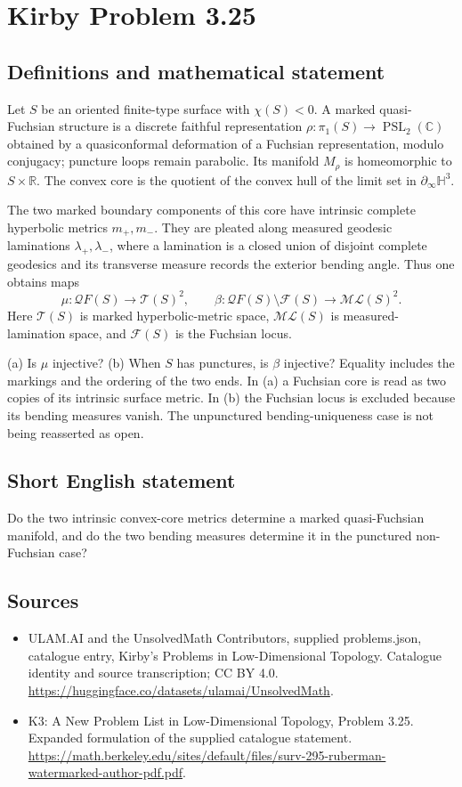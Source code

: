 \documentclass[11pt,a4paper]{article}
\begin{document}
\section*{Kirby Problem 3.25}\label{statement}

\subsection{Definitions and mathematical statement}
Let $S$ be an oriented finite-type surface with $\chi(S)<0$. A marked
quasi-Fuchsian structure is a discrete faithful representation
$\rho:\pi_1(S)\to\operatorname{PSL}_2(\mathbb C)$ obtained by a
quasiconformal deformation of a Fuchsian representation, modulo conjugacy;
puncture loops remain parabolic. Its manifold $M_\rho$ is homeomorphic to
$S\times\mathbb R$. The convex core is the quotient of the convex hull
of the limit set in $\partial_\infty\mathbb H^3$.

The two marked boundary components of this core have intrinsic complete
hyperbolic metrics $m_+,m_-$. They are pleated along measured geodesic
laminations $\lambda_+,\lambda_-$, where a lamination is a closed union
of disjoint complete geodesics and its transverse measure records the
exterior bending angle. Thus one obtains maps
\[
 \mu:\mathcal QF(S)\to\mathcal T(S)^2,\qquad
 \beta:\mathcal QF(S)\setminus\mathcal F(S)\to\mathcal{ML}(S)^2.
\]
Here $\mathcal T(S)$ is marked hyperbolic-metric space, $\mathcal{ML}(S)$
is measured-lamination space, and $\mathcal F(S)$ is the Fuchsian locus.

(a) Is $\mu$ injective? (b) When $S$ has punctures, is $\beta$ injective?
Equality includes the markings and the ordering of the two ends. In (a)
a Fuchsian core is read as two copies of its intrinsic surface metric.
In (b) the Fuchsian locus is excluded because its bending measures vanish.
The unpunctured bending-uniqueness case is not being reasserted as open.
\subsection{Short English statement}
Do the two intrinsic convex-core metrics determine a marked quasi-Fuchsian manifold, and do the two bending measures determine it in the punctured non-Fuchsian case?
\subsection{Sources}
\begin{itemize}
\item[S1] ULAM.AI and the UnsolvedMath Contributors, supplied problems.json, catalogue entry, Kirby's Problems in Low-Dimensional Topology. Catalogue identity and source transcription; CC BY 4.0.
\url{https://huggingface.co/datasets/ulamai/UnsolvedMath}.
\item[S2] K3: A New Problem List in Low-Dimensional Topology, Problem 3.25. Expanded formulation of the supplied catalogue statement.
\url{https://math.berkeley.edu/sites/default/files/surv-295-ruberman-watermarked-author-pdf.pdf}.
\end{itemize}
\end{document}

